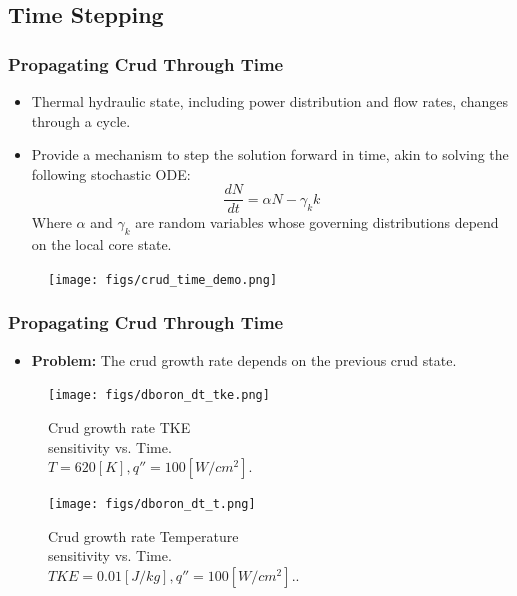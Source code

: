 \documentclass[t, pdftex]{beamer}
\begin{document}
\subsection*{Time Stepping}
\begin{frame}
\frametitle{Propagating Crud Through Time}
\vspace{-16pt}
\begin{itemize}
    \item Thermal hydraulic state, including power distribution and flow rates, changes through a cycle.  
    \item Provide a mechanism to step the solution forward in time, akin to solving the following stochastic ODE:
    \[
    \frac{d N}{d t} = \alpha N - \gamma_k k
    \]
    Where $\alpha$ and $\gamma_k$ are random variables whose governing distributions depend on the local core state.
\end{itemize}

\begin{figure}[]
\centering
\texttt{[image: figs/crud\_time\_demo.png]}
\label{model_overview}
\end{figure}
\end{frame}


\begin{frame}[shrink=10]
\frametitle{Propagating Crud Through Time}
\begin{itemize}
\item  \textbf{Problem:}  The crud growth rate depends on the previous crud state. 
\end{itemize}
\begin{figure}[!htbp]
\centering
\begin{minipage}{.5\textwidth}
  \texttt{[image: figs/dboron\_dt\_tke.png]}
\caption{\centering Crud growth rate TKE \\ sensitivity vs. Time. \\ $T=620[K], q''=100[W/cm^2]$.} 
\label{fig:crud_pre_map}
\end{minipage}%
\begin{minipage}{.5\textwidth}
  \texttt{[image: figs/dboron\_dt\_t.png]}
\caption{\centering Crud growth rate Temperature \\ sensitivity vs. Time. \\ $TKE=0.01[J/kg], q''=100[W/cm^2]$..}
\label{fig:crud_post_map}
\end{minipage}
\end{figure}
\end{frame}
\end{document}
